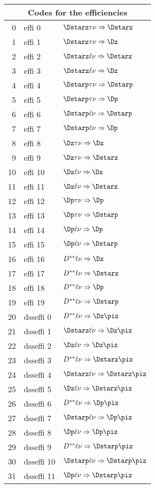 \documentclass[6pt]{article}
\begin{document}
\begin{tabular}{r l l}\\ \hline\hline
\multicolumn{3}{c}{\bf Codes for the efficiencies}\\ \hline
0 & effi 0   & $\Dstarz\tau\nu\Rightarrow\Dstarz$\\
1 & effi 1   & $\Dstarz\tau\nu\Rightarrow\Dz$\\
2 & effi 2   & $\Dstarz\ell\nu\Rightarrow\Dstarz$\\
3 & effi 3   & $\Dstarz\ell\nu\Rightarrow\Dz$\\
4 & effi 4   & $\Dstarp\tau\nu\Rightarrow\Dstarp$\\
5 & effi 5   & $\Dstarp\tau\nu\Rightarrow\Dp$\\
6 & effi 6   & $\Dstarp\ell\nu\Rightarrow\Dstarp$\\
7 & effi 7   & $\Dstarp\ell\nu\Rightarrow\Dp$\\
8 & effi 8   & $\Dz\tau\nu\Rightarrow\Dz$\\
9 & effi 9   & $\Dz\tau\nu\Rightarrow\Dstarz$\\
10 & effi 10 & $\Dz\ell\nu\Rightarrow\Dz$\\
11 & effi 11 & $\Dz\ell\nu\Rightarrow\Dstarz$\\
12 & effi 12 & $\Dp\tau\nu\Rightarrow\Dp$\\
13 & effi 13 & $\Dp\tau\nu\Rightarrow\Dstarp$\\
14 & effi 14 & $\Dp\ell\nu\Rightarrow\Dp$\\
15 & effi 15 & $\Dp\ell\nu\Rightarrow\Dstarp$\\
16 & effi 16 & $D^{**}\ell\nu\Rightarrow\Dz$\\
17 & effi 17 & $D^{**}\ell\nu\Rightarrow\Dstarz$\\
18 & effi 18 & $D^{**}\ell\nu\Rightarrow\Dp$\\
19 & effi 19 & $D^{**}\ell\nu\Rightarrow\Dstarp$\\
20 & dsseffi 0  & $D^{**}\ell\nu\Rightarrow\Dz\piz$\\
21 & dsseffi 1  & $\Dstarz\ell\nu\Rightarrow\Dz\piz$\\
22 & dsseffi 2  & $\Dz\ell\nu\Rightarrow\Dz\piz$\\
23 & dsseffi 3  & $D^{**}\ell\nu\Rightarrow\Dstarz\piz$\\
24 & dsseffi 4  & $\Dstarz\ell\nu\Rightarrow\Dstarz\piz$\\
25 & dsseffi 5  & $\Dz\ell\nu\Rightarrow\Dstarz\piz$\\
26 & dsseffi 6  & $D^{**}\ell\nu\Rightarrow\Dp\piz$\\
27 & dsseffi 7  & $\Dstarp\ell\nu\Rightarrow\Dp\piz$\\
28 & dsseffi 8  & $\Dp\ell\nu\Rightarrow\Dp\piz$\\
29 & dsseffi 9  & $D^{**}\ell\nu\Rightarrow\Dstarp\piz$\\
30 & dsseffi 10 & $\Dstarp\ell\nu\Rightarrow\Dstarp\piz$\\
31 & dsseffi 11 & $\Dp\ell\nu\Rightarrow\Dstarp\piz$\\
\hline\hline
\end{tabular}
\end{document}
